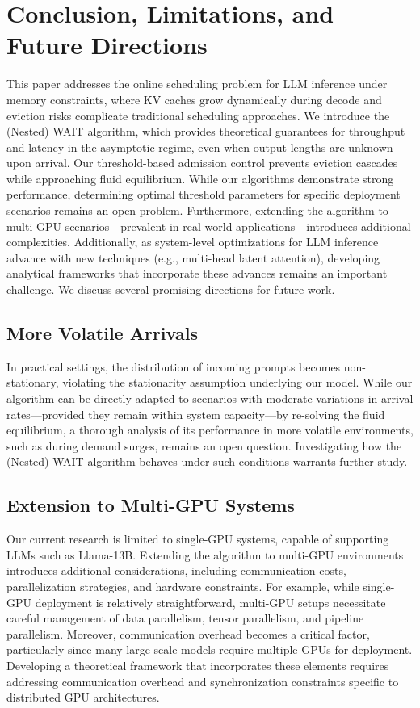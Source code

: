 \section{Conclusion, Limitations, and Future Directions}

This paper addresses the online scheduling problem for LLM inference under memory constraints, where KV caches grow dynamically during decode and eviction risks complicate traditional scheduling approaches. We introduce the (Nested) WAIT algorithm, which provides theoretical guarantees for throughput and latency in the asymptotic regime, even when output lengths are unknown upon arrival. Our threshold-based admission control prevents eviction cascades while approaching fluid equilibrium. While our algorithms demonstrate strong performance, determining optimal threshold parameters for specific deployment scenarios remains an open problem. Furthermore, extending the algorithm to multi-GPU scenarios---prevalent in real-world applications---introduces additional complexities. Additionally, as system-level optimizations for LLM inference advance with new techniques (e.g., multi-head latent attention), developing analytical frameworks that incorporate these advances remains an important challenge. We discuss several promising directions for future work.

\subsection{More Volatile Arrivals}

In practical settings, the distribution of incoming prompts becomes non-stationary, violating the stationarity assumption underlying our model. While our algorithm can be directly adapted to scenarios with moderate variations in arrival rates—provided they remain within system capacity—by re-solving the fluid equilibrium, a thorough analysis of its performance in more volatile environments, such as during demand surges, remains an open question. Investigating how the (Nested) WAIT algorithm behaves under such conditions warrants further study.

\subsection{Extension to Multi-GPU Systems}
Our current research is limited to single-GPU systems, capable of supporting LLMs such as Llama-13B. Extending the algorithm to multi-GPU environments introduces additional considerations, including communication costs, parallelization strategies, and hardware constraints. For example, while single-GPU deployment is relatively straightforward, multi-GPU setups necessitate careful management of data parallelism, tensor parallelism, and pipeline parallelism. Moreover, communication overhead becomes a critical factor, particularly since many large-scale models require multiple GPUs for deployment. Developing a theoretical framework that incorporates these elements requires addressing communication overhead and synchronization constraints specific to distributed GPU architectures.


